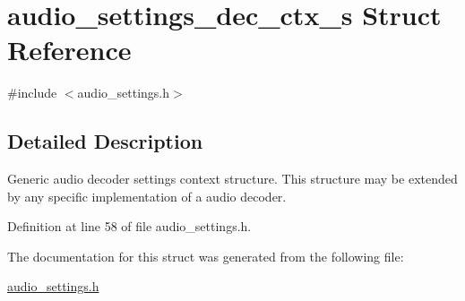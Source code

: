 \hypertarget{structaudio__settings__dec__ctx__s}{}\section{audio\+\_\+settings\+\_\+dec\+\_\+ctx\+\_\+s Struct Reference}
\label{structaudio__settings__dec__ctx__s}


{\ttfamily \#include $<$audio\+\_\+settings.\+h$>$}



\subsection{Detailed Description}
Generic audio decoder settings context structure. This structure may be extended by any specific implementation of a audio decoder. 

Definition at line 58 of file audio\+\_\+settings.\+h.



The documentation for this struct was generated from the following file\+:\begin{DoxyCompactItemize}
\item 
\hyperlink{audio__settings_8h}{audio\+\_\+settings.\+h}\end{DoxyCompactItemize}

